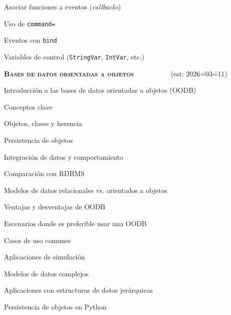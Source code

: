 \begin{longenum}
\begin{longenum}
\begin{longenum}
            \item Asociar funciones a eventos (\textit{callbacks})
            \item Uso de \texttt{command=}
            \item Eventos con \texttt{bind}
            \item Variables de control (\texttt{StringVar}, \texttt{IntVar}, etc.)
        \end{longenum}
    \end{longenum}
    \item \textbf{\textsc{Bases de datos orientadas a objetos}} \ \ \ \ \ \ \ \ \ \ (est: 2026\==03\==11)
    \begin{longenum}
        \item Introducción a las bases de datos orientadas a objetos (OODB)
        \begin{longenum}
            \item Conceptos clave
            \begin{longenum}
                \item Objetos, clases y herencia
                \item Persistencia de objetos
                \item Integración de datos y comportamiento
            \end{longenum}
            \item Comparación con RDBMS
            \begin{longenum}
                \item Modelos de datos relacionales vs. orientados a objetos
                \item Ventajas y desventajas de OODB
                \item Escenarios donde es preferible usar una OODB
            \end{longenum}
            \item Casos de uso comunes
            \begin{longenum}
                \item Aplicaciones de simulación
                \item Modelos de datos complejos
                \item Aplicaciones con estructuras de datos jerárquicas
            \end{longenum}
        \end{longenum}
        \item Persistencia de objetos en Python

\end{longenum}
\end{longenum}
